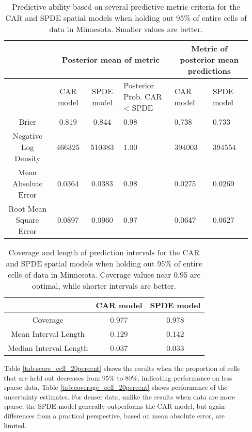 \documentclass[12pt]{article}\usepackage[]{graphicx}\usepackage[]{color}
\providecommand{\tabularnewline}{\\}
\begin{document}
\begin{table}
\caption{Predictive ability based on several predictive metric criteria for
the CAR and SPDE spatial models when holding out 95\% of entire cells
of data in Minnesota. Smaller values are better.}


\begin{tabular}{|c|c|c|>{\centering}p{3cm}|>{\centering}p{2.5cm}|>{\centering}p{2.5cm}|}
\hline 
 &
\multicolumn{3}{c|}{{\small{Posterior mean of metric}}} &
\multicolumn{2}{c|}{{\small{Metric of posterior mean predictions}}}\tabularnewline
\hline 
\hline 
 &
{\small{CAR model}} &
{\small{SPDE model}} &
{\small{Posterior Prob. CAR < SPDE}} &
{\small{CAR model}} &
{\small{SPDE model}}\tabularnewline
\hline 
{\small{Brier}} &
{\small{0.819}} &
{\small{0.844}} &
{\small{0.98}} &
{\small{0.738}} &
{\small{0.733}}\tabularnewline
\hline 
{\small{Negative Log Density}} &
{\small{466325}} &
{\small{510383}} &
{\small{1.00}} &
{\small{394003}} &
{\small{394554}}\tabularnewline
\hline 
{\small{Mean Absolute Error}} &
{\small{0.0364}} &
{\small{0.0383}} &
{\small{0.98}} &
{\small{0.0275}} &
{\small{0.0269}}\tabularnewline
\hline 
{\small{Root Mean Square Error}} &
{\small{0.0897}} &
{\small{0.0960}} &
{\small{0.97}} &
{\small{0.0647}} &
{\small{0.0627}}\tabularnewline
\hline 
\end{tabular}

\label{tab:score_cell_fivepercent}
\end{table}


\begin{table}
\caption{Coverage and length of prediction intervals for the CAR and SPDE spatial
models when holding out 95\% of entire cells of data in Minnesota.
Coverage values near 0.95 are optimal, while shorter intervals are
better.}


\begin{tabular}{|c|c|c|}
\hline 
 &
{\small{CAR model}} &
{\small{SPDE model}}\tabularnewline
\hline 
{\small{Coverage}} &
{\small{0.977}} &
{\small{0.978}}\tabularnewline
\hline 
{\small{Mean Interval Length}} &
{\small{0.129}} &
{\small{0.142}}\tabularnewline
\hline 
{\small{Median Interval Length}} &
{\small{0.037}} &
{\small{0.033}}\tabularnewline
\hline 
\end{tabular}

\label{tab:coverage_cell_fivepercent}
\end{table}




Table \ref{tab:score_cell_20percent} shows the results when the proportion
of cells that are held out decreases from 95\% to 80\%, indicating
performance on less sparse data. Table \ref{tab:coverage_cell_20percent}
shows performance of the uncertainty estimates. For denser data, unlike
the results when data are more sparse, the SPDE model generally outperforms
the CAR model, but again differences from a practical perspective,
based on mean absolute error, are limited.
\end{document}
